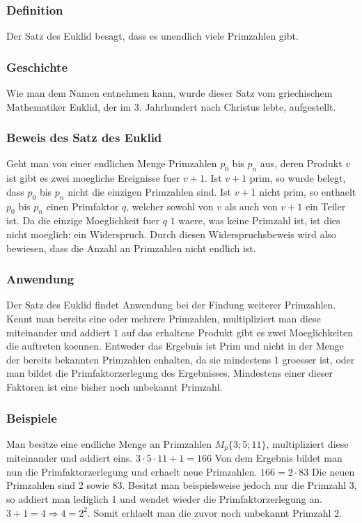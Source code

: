 \subsubsection{Definition}
Der Satz des Euklid besagt, dass es unendlich viele Primzahlen gibt.
\subsubsection{Geschichte}
Wie man dem Namen entnehmen kann, wurde dieser Satz vom griechischem Mathematiker Euklid, der im 3. Jahrhundert nach Christus lebte, aufgestellt.
\subsubsection{Beweis des Satz des Euklid}
Geht man von einer endlichen Menge Primzahlen $p_0$ bis $p_n$ aus, deren Produkt $v$ ist gibt es zwei moegliche Ereignisse fuer $v + 1$.
Ist $v + 1$ prim, so wurde belegt, dass  $p_0$ bis $p_n$ nicht die einzigen Primzahlen sind.
Ist $v + 1$ nicht prim, so enthaelt $p_0$ bis $p_n$ einen Primfaktor $q$, welcher sowohl von $v$ als auch von $v + 1$ ein Teiler ist. Da die einzige Moeglichkeit fuer $q$ $1$ waere, was keine Primzahl ist, ist dies nicht moeglich: ein Widerspruch.
Durch diesen Widerspruchsbeweis wird also bewiesen, dass die Anzahl an Primzahlen nicht endlich ist.
\subsubsection{Anwendung}
Der Satz des Euklid findet Anwendung bei der Findung weiterer Primzahlen. Kennt man bereits eine oder mehrere Primzahlen, multipliziert man diese miteinander und addiert $1$ auf das erhaltene Produkt gibt es zwei Moeglichkeiten die auftreten koennen. Entweder das Ergebnis ist Prim und nicht in der Menge der bereits bekannten  Primzahlen enhalten, da sie mindestens $1$ groesser ist, oder man bildet die Primfaktorzerlegung des Ergebnisses. Mindestens einer dieser Faktoren ist eine bisher noch unbekannt Primzahl.
\subsubsection{Beispiele}
Man besitze eine endliche Menge an Primzahlen $M_p\{3; 5; 11\}$, multipliziert diese miteinander und addiert eins.\newline
$3 \cdot 5 \cdot 11 + 1 = 166$\newline
Von dem Ergebnis bildet man nun die Primfaktorzerlegung und erhaelt neue Primzahlen.\newline
$166 = 2 \cdot 83$\newline
Die neuen Primzahlen sind 2 sowie 83.\newline
Besitzt man beispielsweise jedoch nur die Primzahl $3$, so addiert man lediglich 1 und wendet wieder die Primfaktorzerlegung an. $3 + 1 = 4 \Rightarrow 4 = 2^2$. Somit erhlaelt man die zuvor noch unbekannt Primzahl 2.
